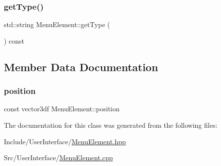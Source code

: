\subsubsection{\texorpdfstring{getType()}{getType()}}
{\footnotesize\ttfamily std\+::string Menu\+Element\+::get\+Type (\begin{DoxyParamCaption}{ }\end{DoxyParamCaption}) const}



\subsection{Member Data Documentation}
\mbox{\label{class_menu_element_a7f59490282ff54f6c82ee478c8ea6cc1}} 
\subsubsection{\texorpdfstring{position}{position}}
{\footnotesize\ttfamily const vector3df Menu\+Element\+::position\hspace{0.3cm}{\ttfamily [protected]}}



The documentation for this class was generated from the following files\+:\begin{DoxyCompactItemize}
\item 
Include/\+User\+Interface/\mbox{\hyperlink{_menu_element_8hpp}{Menu\+Element.\+hpp}}\item 
Src/\+User\+Interface/\mbox{\hyperlink{_menu_element_8cpp}{Menu\+Element.\+cpp}}\end{DoxyCompactItemize}
